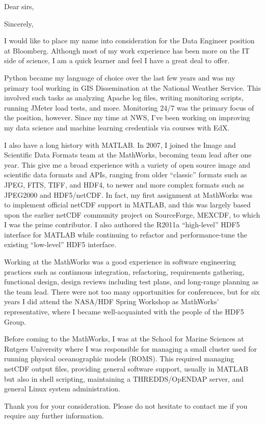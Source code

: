 \documentclass[11pt]{moderncv}  %
\begin{document}
\opening{Dear sirs,}
\closing{Sincerely,}


\makelettertitle

I would like to place my name into consideration for the Data Engineer
position at Bloomberg.  Although most of my work experience has been more on the IT
side of science, I am a quick learner and feel I have a great deal to offer.

Python became my language of choice over the last few years and was
my primary tool working in GIS Dissemination at the National Weather
Service.  This involved such tasks as analyzing Apache log files,
writing monitoring scripts, running JMeter load tests, and more.
Monitoring 24/7 was the primary focus of the position, however.
Since my time at NWS, I've been working on improving my data science
and machine learning credentials via courses with EdX.

I also have a long history with MATLAB.  In 2007, I joined the Image
and Scientific Data Formats team at the MathWorks, becoming  team
lead after one year.  This give me a broad experience with a variety
of open source image and scientific data formats and APIs, ranging
from older “classic” formats such as JPEG, FITS, TIFF, and HDF4,
to newer and more complex formats such as JPEG2000 and HDF5/netCDF.
In fact, my first assignment at MathWorks was to implement official
netCDF support in MATLAB, and this was largely based upon the earlier
netCDF community project on SourceForge, MEXCDF, to which I was the
prime contributor.   I also authored the R2011a “high-level” HDF5
interface for MATLAB while continuing to refactor and performance-tune
the existing “low-level” HDF5 interface.

Working at the MathWorks was a good experience in software engineering
practices such as continuous integration, refactoring, requirements
gathering, functional design, design reviews including test plans,
and long-range planning as the team lead.   There were not too many
opportunities for conferences, but for six years I did attend the
NASA/HDF Spring Workshop as MathWorks’ representative, where I
became well-acquainted with the people of the HDF5 Group.

Before coming to the MathWorks, I was at the School for Marine
Sciences at Rutgers University where I was responsible for managing
a small cluster used for running physical oceanographic models
(ROMS).  This required managing  netCDF output files, providing
general software support, usually in MATLAB but also in shell
scripting, maintaining a THREDDS/OpENDAP server, and general Linux
system administration.

Thank you for your consideration.  Please do not hesitate to contact
me if you require any further information.

\makeletterclosing
\end{document}

